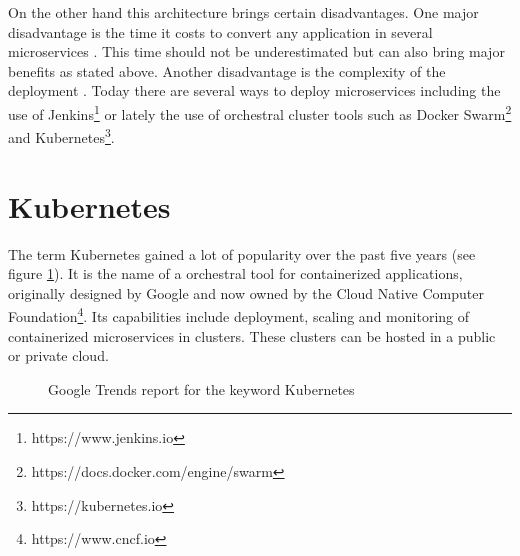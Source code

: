 \documentclass[
	ngerman,
	ruledheaders=section,%
	class=report,%
	thesis={type=master},%
	accentcolor=8c,%
	custommargins=false,%
	marginpar=false,%
	parskip=half-,%
	fontsize=11pt,%
]{tudapub}
\begin{document}
On the other hand this architecture brings certain disadvantages.
One major disadvantage is the time it costs to convert any application in several microservices \cite{dragoni2017microservices}. This time should not be underestimated but can also bring major benefits as stated above.
Another disadvantage is the complexity of the deployment \cite{dragoni2017microservices}. Today there are several ways to deploy microservices including the use of Jenkins\footnote{https://www.jenkins.io} or lately the use of orchestral cluster tools such as Docker Swarm\footnote{https://docs.docker.com/engine/swarm} and Kubernetes\footnote{https://kubernetes.io}.\\
\section{Kubernetes}
The term Kubernetes gained a lot of popularity over the past five years (see figure \ref{fig:google-trends}). It is the name of a orchestral tool for containerized applications, originally designed by Google and now owned by the Cloud Native Computer Foundation\footnote{https://www.cncf.io}. Its capabilities include deployment, scaling and monitoring of containerized microservices in clusters. These clusters can be hosted in a public or private cloud.\\
\begin{figure}[h]
\label{fig:google-trends}
\centering
{}
\caption{Google Trends report for the keyword Kubernetes \cite{googletrends2020}}
\end{figure}
\end{document}
